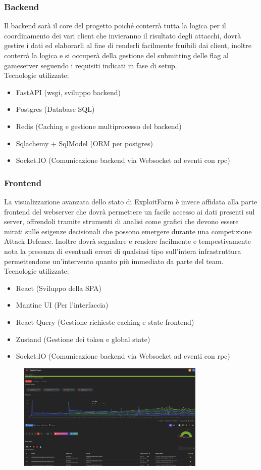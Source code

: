 \documentclass[11pt]{article}
\begin{document}
\subsubsection{Backend}
Il backend sarà il core del progetto poiché conterrà tutta la logica per il coordinamento dei vari client che invieranno il risultato degli attacchi, dovrà gestire i dati ed elaborarli al fine di renderli facilmente fruibili dai client, inoltre conterrà la logica e si occuperà della gestione del submitting delle flag al gameserver seguendo i requisiti indicati in fase di setup.
\\Tecnologie utilizzate:
	\begin{itemize}
		\item FastAPI (wsgi, sviluppo backend)
		\item Postgres (Database SQL)
		\item Redis (Caching e gestione multiprocesso del backend)
		\item Sqlachemy + SqlModel (ORM per postgres)
		\item Socket.IO (Comunicazione backend via Websocket ad eventi con rpc)
	\end{itemize}
\subsubsection{Frontend}
La visualizzazione avanzata dello stato di ExploitFarm è invece affidata alla parte frontend del webserver che dovrà permettere un facile accesso ai dati presenti sul server, offrendoli tramite strumenti di analisi come grafici che devono essere mirati sulle esigenze decisionali che possono emergere durante una competizione Attack Defence. Inoltre dovrà segnalare e rendere facilmente e tempestivamente nota la presenza di eventuali errori di qualsiasi tipo sull'intera infrastruttura permettendone un'intervento quanto più immediato da parte del team.
\\Tecnologie utilizzate:
	\begin{itemize}
		\item React (Sviluppo della SPA)
		\item Mantine UI (Per l'interfaccia)
		\item React Query (Gestione richieste caching e state frontend)
		\item Zustand (Gestione dei token e global state)
		\item Socket.IO (Comunicazione backend via Websocket ad eventi con rpc)
	\end{itemize}
    \begin{figure}[H]
    	\centering
    	\includegraphics[width=0.8\textwidth]{exploitfarm-web.png}
	\end{figure}
\end{document}
